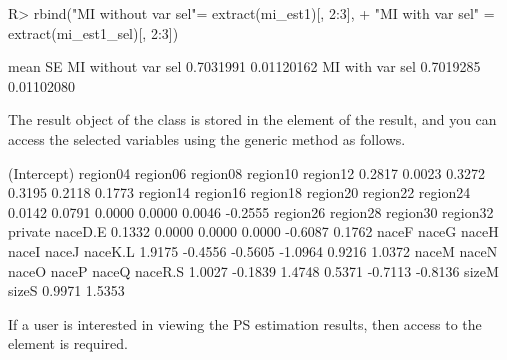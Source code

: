 \documentclass[
]{jss}
\begin{document}
\begin{CodeChunk}
\begin{CodeInput}
R> rbind("MI without var sel"= extract(mi_est1)[, 2:3],
+       "MI with var sel"   = extract(mi_est1_sel)[, 2:3])
\end{CodeInput}
\begin{CodeOutput}
                        mean         SE
MI without var sel 0.7031991 0.01120162
MI with var sel    0.7019285 0.01102080
\end{CodeOutput}
\end{CodeChunk}

The result object of the  class is stored in the
 element of the result, and you can access the selected
variables using the  generic method as follows.

\begin{CodeChunk}
\begin{CodeOutput}
(Intercept)    region04    region06    region08    region10    region12 
     0.2817      0.0023      0.3272      0.3195      0.2118      0.1773 
   region14    region16    region18    region20    region22    region24 
     0.0142      0.0791      0.0000      0.0000      0.0046     -0.2555 
   region26    region28    region30    region32     private     naceD.E 
     0.1332      0.0000      0.0000      0.0000     -0.6087      0.1762 
      naceF       naceG       naceH       naceI       naceJ     naceK.L 
     1.9175     -0.4556     -0.5605     -1.0964      0.9216      1.0372 
      naceM       naceN       naceO       naceP       naceQ     naceR.S 
     1.0027     -0.1839      1.4748      0.5371     -0.7113     -0.8136 
      sizeM       sizeS 
     0.9971      1.5353 
\end{CodeOutput}
\end{CodeChunk}

If a user is interested in viewing the PS estimation results, then
access to the  element is required.
\end{document}

